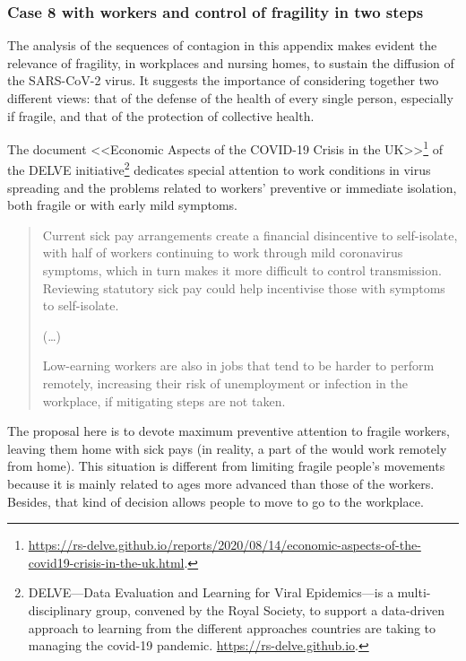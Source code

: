 \documentclass[11pt]{article}
\begin{document}
\subsubsection{Case 8 with workers and control of fragility in two steps}
\label{c8}


The analysis of the sequences of contagion in this appendix makes evident the relevance of fragility, in workplaces and nursing homes, to sustain the diffusion of the SARS-CoV-2 virus. It suggests the importance of considering together two different views: that of the defense of the health of every single person, especially if fragile, and that of the protection of collective health.

The document 
<<Economic Aspects of the COVID-19 Crisis in the UK>>\footnote{\url{https://rs-delve.github.io/reports/2020/08/14/economic-aspects-of-the-covid19-crisis-in-the-uk.html}.}
of the DELVE initiative\footnote{DELVE---Data Evaluation and Learning for Viral Epidemics---is a multi-disciplinary group, convened by the Royal Society, to support a data-driven approach to learning from the different approaches countries are taking to managing the covid-19 pandemic. \url{https://rs-delve.github.io}.}
dedicates special attention to work conditions in virus spreading and the problems related to workers' preventive or immediate isolation, both fragile or with early mild symptoms.

\begin{quote}
Current sick pay arrangements create a financial disincentive to self-isolate, with half of workers continuing to work through mild coronavirus symptoms, which in turn makes it more difficult to control transmission. Reviewing statutory sick pay could help incentivise those with symptoms to self-isolate.

(\ldots)

Low-earning workers are also in jobs that tend to be harder to perform remotely, increasing their risk of unemployment or infection in the workplace, if mitigating steps are not taken.
\end{quote}

The proposal here is to devote maximum preventive attention to fragile workers, leaving them home with sick pays (in reality, a part of the would work remotely from home). This situation is different from limiting fragile people's movements because it is mainly related to ages more advanced than those of the workers. Besides, that kind of decision allows people to move to go to the workplace. 
\end{document}
